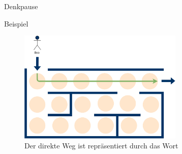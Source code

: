 {
\begin{frame}{Denkpause}
    \begin{alertblock}{Beispiel}
        \begin{figure}
            \centering
            \includegraphics[width=0.7\textwidth]{../figures/GBeispiel1.png}
            \caption{Der direkte Weg ist repräsentiert durch das Wort \alert{\MoveDown\Forward\Forward\Forward\Forward\Forward\Forward}}
        \end{figure}
    \end{alertblock}
\end{frame}
}

